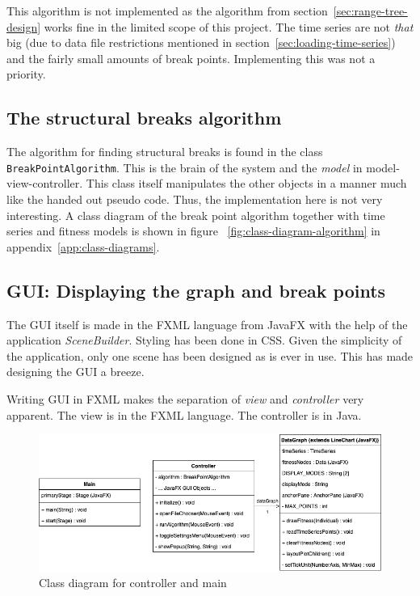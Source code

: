 This algorithm is not implemented as the algorithm from
section~\ref{sec:range-tree-design} works fine in the limited scope of this
project. The time series are not \textit{that} big (due to data file restrictions
mentioned in section~\ref{sec:loading-time-series}) and the fairly small amounts
of break points. Implementing this was not a priority. 




\subsection{The structural breaks algorithm}

The algorithm for finding structural breaks is found in the class
\texttt{BreakPointAlgorithm}. This is the brain of the system and the
\textit{model} in model-view-controller. This class itself manipulates the other
objects in a manner much like the handed out pseudo code. Thus, the
implementation here is not very interesting. A class diagram of the break point
algorithm together with time series and fitness models is shown in figure
~\ref{fig:class-diagram-algorithm} in appendix~\ref{app:class-diagrams}.


\subsection{GUI: Displaying the graph and break points}
\label{sec:graph-implementation}

The GUI itself is made in the FXML language from JavaFX with the help of the
application \textit{SceneBuilder}. Styling has been done in CSS. Given the simplicity of the application, only one
scene has been designed as is ever in use. This has made 
designing the GUI a breeze. 

Writing GUI in FXML makes the separation of \textit{view} and
\textit{controller} very apparent. The view is in the FXML language. The
controller is in Java. 

\begin{figure}[ht]
    \centering
    \includegraphics[width=.8\textwidth]{fig/class-diagram-controller.png}
    \caption{Class diagram for controller and main}
    \label{fig:class-diagram-controller}
\end{figure}

